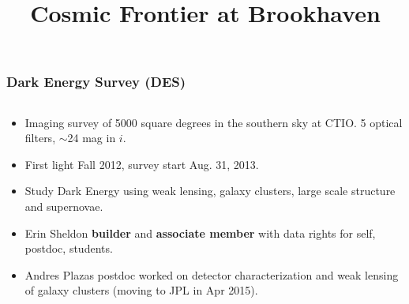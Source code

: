 \documentclass{beamer}
\title{Cosmic Frontier at Brookhaven}
\begin{document}

\frame
{

    \frametitle{Dark Energy Survey (DES)}

    \fontsize{9}{0.8\baselineskip}

    \begin{columns}

        \begin{column}{0.5\textwidth}

            \begin{itemize}

                \item Imaging survey of 5000 square degrees in the southern
                    sky at CTIO.  5 optical filters, $\sim$24 mag in $i$.

                \item First light Fall 2012, survey start Aug. 31, 2013.

                \item Study Dark Energy using weak lensing, galaxy clusters,
                    large scale structure and supernovae.

                \item Erin Sheldon {\bf builder} and {\bf associate
                    member} with data rights for self, postdoc, students.

                \item Andres Plazas postdoc worked on detector characterization
                    and weak lensing of galaxy clusters (moving to JPL in Apr 2015).

            \end{itemize}

        \end{column}


\end{columns}}
\end{document}
